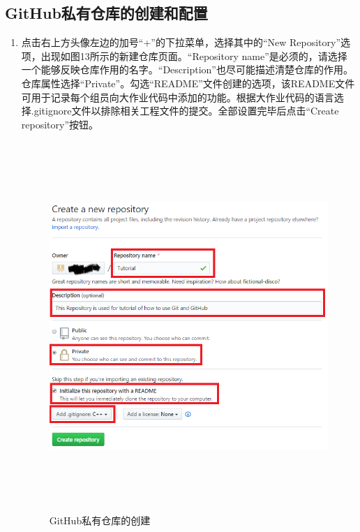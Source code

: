 \documentclass[a4paper,14pt]{article}
\begin{document}
\subsection*{GitHub私有仓库的创建和配置}
\begin{enumerate}[1. ]
\item 点击右上方头像左边的加号“+”的下拉菜单，选择其中的“New Repository”选项，出现如图13所示的新建仓库页面。“Repository name”是必须的，请选择一个能够反映仓库作用的名字。“Description”也尽可能描述清楚仓库的作用。仓库属性选择“Private”。勾选“README”文件创建的选项，该README文件可用于记录每个组员向大作业代码中添加的功能。根据大作业代码的语言选择.gitignore文件以排除相关工程文件的提交。全部设置完毕后点击“Create repository”按钮。
\begin{figure}[h]
\centering
\includegraphics[height=14cm]{figure/Repository}
\caption{GitHub私有仓库的创建}
\end{figure}
\newpage

\quad

\quad

\quad


\end{enumerate}
\end{document}
